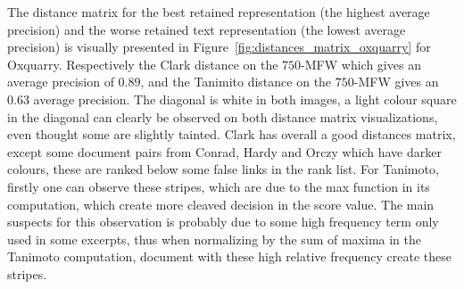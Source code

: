 The distance matrix for the best retained representation (the highest average precision) and the worse retained text representation (the lowest average precision) is visually presented in Figure~\ref{fig:distances_matrix_oxquarry} for Oxquarry.
Respectively the Clark distance on the $750$-MFW which gives an average precision of $0.89$, and the Tanimito distance on the $750$-MFW gives an $0.63$ average precision.
The diagonal is white in both images, a light colour square in the diagonal can clearly be observed on both distance matrix visualizations, even thought some are slightly tainted.
Clark has overall a good distances matrix, except some document pairs from Conrad, Hardy and Orczy which have darker colours, these are ranked below some false links in the rank list.
For Tanimoto, firstly one can observe these stripes, which are due to the max function in its computation, which create more cleaved decision in the score value.
The main suspects for this observation is probably due to some high frequency term only used in some excerpts, thus when normalizing by the sum of maxima in the Tanimoto computation, document with these high relative frequency create these stripes.

